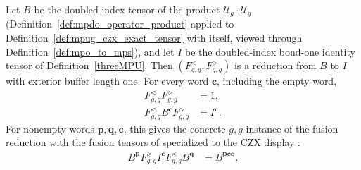 \begin{lemma}
    \label{thm:mpug_czx_fusion_reduction}
    \leanok
    Let $B$ be the doubled-index tensor of the product
    $\mathcal U_g\cdot\mathcal U_g$
    (Definition~\ref{def:mpdo_operator_product} applied to
    Definition~\ref{def:mpug_czx_exact_tensor} with itself, viewed
    through Definition~\ref{def:mpo_to_mps}), and let $I$ be the
    doubled-index bond-one identity tensor of
    Definition~\ref{threeMPU}. Then $(F^<_{g,g},F^>_{g,g})$ is a
    reduction from $B$ to $I$ with exterior buffer length one. For every
    word $\mathbf c$, including the empty word,
    \begin{align}
        F^<_{g,g}F^>_{g,g}              & =1,             \\
        F^<_{g,g}B^{\mathbf c}F^>_{g,g} & =I^{\mathbf c}.
    \end{align}
    For nonempty words $\mathbf p,\mathbf q,\mathbf c$, this gives the
    concrete $g,g$ instance of the fusion reduction
    \cite[lines~1405--1498]{FrancoRubio2025MPUGauging} with the fusion
    tensors of \cite[lines~2000--2037]{FrancoRubio2025MPUGauging}
    specialized to the CZX display
    \cite[lines~4671--4689]{FrancoRubio2025MPUGauging}:
    \begin{align}
        B^{\mathbf p}F^>_{g,g}I^{\mathbf c}F^<_{g,g}B^{\mathbf q}
         & =B^{\mathbf p\mathbf c\mathbf q}.
        \label{eq:mpug_czx_fusion_reduction}
    \end{align}
\end{lemma}
